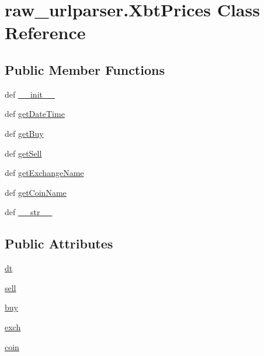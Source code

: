 \hypertarget{classraw__urlparser_1_1_xbt_prices}{\section{raw\-\_\-urlparser.\-Xbt\-Prices Class Reference}
\label{classraw__urlparser_1_1_xbt_prices}
}
\subsection*{Public Member Functions}
\begin{DoxyCompactItemize}
\item 
def \hyperlink{classraw__urlparser_1_1_xbt_prices_aea4d8c7d904f5aeaf71d4e60191aff23}{\-\_\-\-\_\-init\-\_\-\-\_\-}
\item 
def \hyperlink{classraw__urlparser_1_1_xbt_prices_a83c01863eb94413a16ea00cb679245bc}{get\-Date\-Time}
\item 
def \hyperlink{classraw__urlparser_1_1_xbt_prices_a50f893a39919d2d0e00e53c6288b68a3}{get\-Buy}
\item 
def \hyperlink{classraw__urlparser_1_1_xbt_prices_a141a6794eea34f738070970fefc0f854}{get\-Sell}
\item 
def \hyperlink{classraw__urlparser_1_1_xbt_prices_a3a8466753538f1491b67174540c32758}{get\-Exchange\-Name}
\item 
def \hyperlink{classraw__urlparser_1_1_xbt_prices_a0790deb0fc5582520e2a3249c14a496a}{get\-Coin\-Name}
\item 
def \hyperlink{classraw__urlparser_1_1_xbt_prices_a271c6108e7daef6fa321171e294df088}{\-\_\-\-\_\-str\-\_\-\-\_\-}
\end{DoxyCompactItemize}
\subsection*{Public Attributes}
\begin{DoxyCompactItemize}
\item 
\hyperlink{classraw__urlparser_1_1_xbt_prices_ae094aa3e73d21d0be219a085f09bcf13}{dt}
\item 
\hyperlink{classraw__urlparser_1_1_xbt_prices_a22b483cac27a5b17f9e7b265c219bb99}{sell}
\item 
\hyperlink{classraw__urlparser_1_1_xbt_prices_a87eba659d6598ffd66c694535e1b7a7a}{buy}
\item 
\hyperlink{classraw__urlparser_1_1_xbt_prices_a016bbd95465aaa14b5c434047df7b7fb}{exch}
\item 
\hyperlink{classraw__urlparser_1_1_xbt_prices_a8d253ccd987bce28e3aaba7a9c486e5f}{coin}
\end{DoxyCompactItemize}


